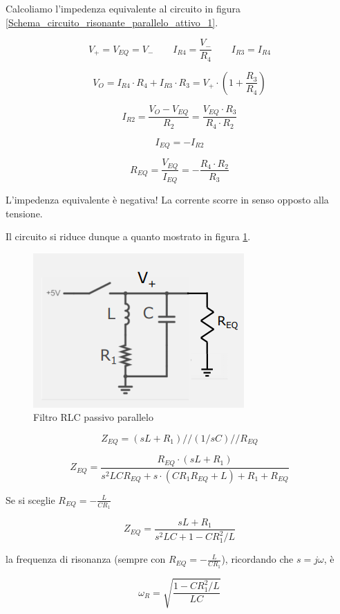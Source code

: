 \documentclass{article}
\begin{document}
Calcoliamo l'impedenza equivalente al circuito in figura \ref{Schema_circuito_risonante_parallelo_attivo_1}.

\[V_+ = V_{EQ} = V_- \quad \quad I_{R4} = \frac{V_-}{R_4} \quad \quad I_{R3} = I_{R4}\]

\[V_O = I_{R4} \cdot R_4 + I_{R3} \cdot R_3 = V_+ \cdot \left(1 + \frac{R_3}{R_4} \right)\]

\[I_{R2} = \frac{V_O - V_{EQ}}{R_2} = \frac{V_{EQ} \cdot R_3}{R_4 \cdot R_2}\]

\[I_{EQ} = - I_{R2}\]

 \[R_{EQ} = \frac{V_{EQ}}{I_{EQ}} = - \frac{R_4 \cdot R_2}{R_3}\]
 
L'impedenza equivalente è negativa! La corrente scorre in senso opposto alla tensione.

\vspace{1mm}

Il circuito si riduce dunque a quanto mostrato in figura \ref{Schema_circuito_risonante_parallelo_attivo_3}.

\begin{figure}[h]
  \centering
  \includegraphics[scale=0.6]{IM_circuito_risonante_parallelo_attivo_3}
  \caption{Filtro RLC passivo parallelo}
  \label{Schema_circuito_risonante_parallelo_attivo_3}
\end{figure}

\[Z_{EQ} = (sL + R_1) // (1/sC) // R_{EQ}\]

\[Z_{EQ} = \frac{R_{EQ} \cdot (sL + R_1)}{s^2 LCR_{EQ} + s \cdot (CR_1 R_{EQ} + L) + R_1 +R_{EQ}}\]

Se si sceglie $R_{EQ} = - \frac{L}{CR_1}$

\[Z_{EQ} = \frac{sL + R_1}{s^2 LC + 1 - C R_1^2/L}\]

la frequenza di risonanza (sempre con $R_{EQ} = - \frac{L}{CR_1}$), ricordando che $s = j\omega$, è

\[\omega_R = \sqrt{\frac{1 - C R_1^2/L}{LC}}\]
\end{document}
